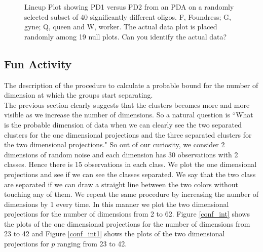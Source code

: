 \documentclass[12]{article}
\begin{document}
\begin{figure}[hbtp]
   \centering
       \caption{Lineup Plot showing PD1 versus PD2 from an PDA on a randomly selected subset of 40 significantly different oligos. F, Foundress; G, gyne; Q, queen and W, worker. The actual data plot is placed randomly among 19 null plots. Can you identify the actual data?  }
       \label{toth_pda}
\end{figure}   




\subsection{Fun Activity}

{\color{red} The description of the procedure to calculate a probable bound for the number of dimension at which the groups start separating. } \\
The previous section clearly suggests that the clusters becomes more and more visible as we increase the number of dimensions. So a natural question is ``What is the probable dimension of data when we can clearly see the two separated clusters for the one dimensional projections and the three separated clusters for the two dimensional projections." So out of our curiosity,  we consider 2 dimensions of random noise and each dimension has 30 observations with 2 classes. Hence there is 15 observations in each class. We plot the one dimensional projections and see if we can see the classes separated. We say that the two class are separated if we can draw a straight line between the two colors without touching any of them. We repeat the same procedure by increasing the number of dimensions by 1 every time. In this manner we plot the two dimensional projections for the number of dimensions from 2 to 62. Figure \ref{conf_int} shows the plots of the one dimensional projections for the number of dimensions from 23 to 42 and Figure \ref{conf_int1} shows the plots of the two dimensional projections for $p$ ranging from 23 to 42.
\end{document}
